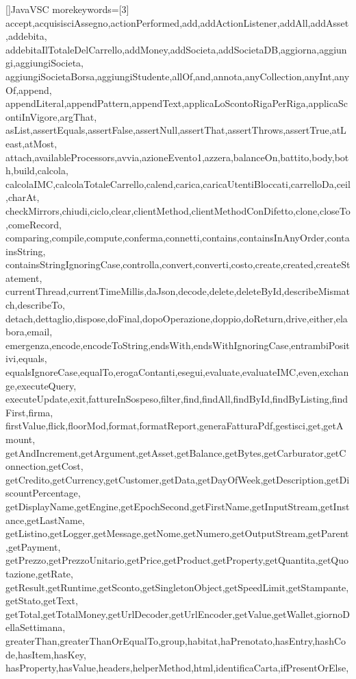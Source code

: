 []{JavaVSC}{
  morekeywords=[3]{
    accept,acquisisciAssegno,actionPerformed,add,addActionListener,addAll,addAsset,addebita,
    addebitaIlTotaleDelCarrello,addMoney,addSocieta,addSocietaDB,aggiorna,aggiungi,aggiungiSocieta,
    aggiungiSocietaBorsa,aggiungiStudente,allOf,and,annota,anyCollection,anyInt,anyOf,append,
    appendLiteral,appendPattern,appendText,applicaLoScontoRigaPerRiga,applicaScontiInVigore,argThat,
    asList,assertEquals,assertFalse,assertNull,assertThat,assertThrows,assertTrue,atLeast,atMost,
    attach,availableProcessors,avvia,azioneEvento1,azzera,balanceOn,battito,body,both,build,calcola,
    calcolaIMC,calcolaTotaleCarrello,calend,carica,caricaUtentiBloccati,carrelloDa,ceil,charAt,
    checkMirrors,chiudi,ciclo,clear,clientMethod,clientMethodConDifetto,clone,closeTo,comeRecord,
    comparing,compile,compute,conferma,connetti,contains,containsInAnyOrder,containsString,
    containsStringIgnoringCase,controlla,convert,converti,costo,create,created,createStatement,
    currentThread,currentTimeMillis,daJson,decode,delete,deleteById,describeMismatch,describeTo,
    detach,dettaglio,dispose,doFinal,dopoOperazione,doppio,doReturn,drive,either,elabora,email,
    emergenza,encode,encodeToString,endsWith,endsWithIgnoringCase,entrambiPositivi,equals,
    equalsIgnoreCase,equalTo,erogaContanti,esegui,evaluate,evaluateIMC,even,exchange,executeQuery,
    executeUpdate,exit,fattureInSospeso,filter,find,findAll,findById,findByListing,findFirst,firma,
    firstValue,flick,floorMod,format,formatReport,generaFatturaPdf,gestisci,get,getAmount,
    getAndIncrement,getArgument,getAsset,getBalance,getBytes,getCarburator,getConnection,getCost,
    getCredito,getCurrency,getCustomer,getData,getDayOfWeek,getDescription,getDiscountPercentage,
    getDisplayName,getEngine,getEpochSecond,getFirstName,getInputStream,getInstance,getLastName,
    getListino,getLogger,getMessage,getNome,getNumero,getOutputStream,getParent,getPayment,
    getPrezzo,getPrezzoUnitario,getPrice,getProduct,getProperty,getQuantita,getQuotazione,getRate,
    getResult,getRuntime,getSconto,getSingletonObject,getSpeedLimit,getStampante,getStato,getText,
    getTotal,getTotalMoney,getUrlDecoder,getUrlEncoder,getValue,getWallet,giornoDellaSettimana,
    greaterThan,greaterThanOrEqualTo,group,habitat,haPrenotato,hasEntry,hashCode,hasItem,hasKey,
    hasProperty,hasValue,headers,helperMethod,html,identificaCarta,ifPresentOrElse,
}}
